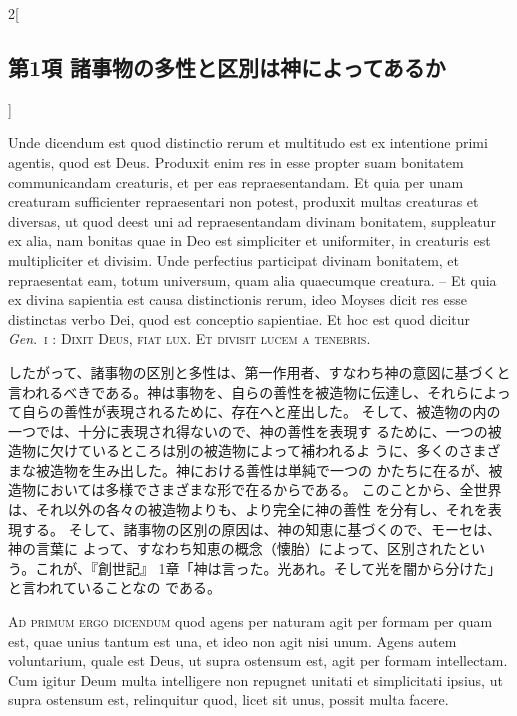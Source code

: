 \documentclass[paper=a4paper,fontsize=10pt,jafontsize=9pt,titlepage]{jlreq}
\begin{document}
\begin{paracol}{2}[\subsection{第1項 諸事物の多性と区別は神によってあるか}]
\switchcolumn*


Unde dicendum est quod distinctio rerum et multitudo est ex intentione
 primi agentis, quod est Deus. Produxit enim res in esse propter suam
 bonitatem communicandam creaturis, et per eas repraesentandam. Et quia
 per unam creaturam sufficienter repraesentari non potest, produxit
 multas creaturas et diversas, ut quod deest uni ad repraesentandam
 divinam bonitatem, suppleatur ex alia, nam bonitas quae in Deo est
 simpliciter et uniformiter, in creaturis est multipliciter et
 divisim. Unde perfectius participat divinam bonitatem, et repraesentat
 eam, totum universum, quam alia quaecumque creatura. -- Et quia ex divina
 sapientia est causa distinctionis rerum, ideo Moyses dicit res esse
 distinctas verbo Dei, quod est conceptio sapientiae. Et hoc est quod
 dicitur {\itshape Gen}.~{\scshape i} : {\scshape Dixit Deus, fiat lux. Et divisit
 lucem a tenebris}.


\switchcolumn


したがって、諸事物の区別と多性は、第一作用者、すなわち神の意図に基づくと
 言われるべきである。神は事物を、自らの善性を被造物に伝達し、それらによっ
 て自らの善性が表現されるために、存在へと産出した。
そして、被造物の内の一つでは、十分に表現され得ないので、神の善性を表現す
 るために、一つの被造物に欠けているところは別の被造物によって補われるよ
 うに、多くのさまざまな被造物を生み出した。神における善性は単純で一つの
 かたちに在るが、被造物においては多様でさまざまな形で在るからである。
このことから、全世界は、それ以外の各々の被造物よりも、より完全に神の善性
 を分有し、それを表現する。
そして、諸事物の区別の原因は、神の知恵に基づくので、モーセは、神の言葉に
 よって、すなわち知恵の概念（懐胎）によって、区別されたという。これが、『創世記』
 1章「神は言った。光あれ。そして光を闇から分けた」と言われていることなの
 である。


\switchcolumn*[\subsection{ad.1}]


{\scshape Ad primum ergo dicendum} quod agens per
 naturam agit per formam per quam est, quae unius tantum est una, et
 ideo non agit nisi unum. Agens autem voluntarium, quale est Deus, ut
 supra ostensum est, agit per formam intellectam. Cum igitur Deum multa
 intelligere non repugnet unitati et simplicitati ipsius, ut supra
 ostensum est, relinquitur quod, licet sit unus, possit multa facere.


\switchcolumn



\end{paracol}
\end{document}
